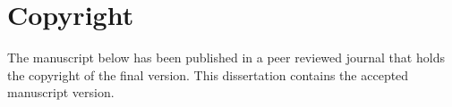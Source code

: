 \singlespacing
\chapter*{Copyright}
The manuscript below has been published in a peer reviewed journal that holds the copyright of the final version. This dissertation contains the accepted manuscript version.

\vspace{3mm}
%


\doublespacing
